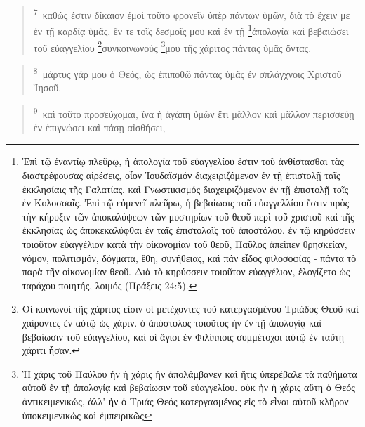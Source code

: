 \documentclass{article}
\newcommand{\currentverse}{1} %
\newcommand{\setcurrentverse}[1]{\renewcommand{\currentverse}{#1}}
\begin{document}
\begin{verse}

\setcurrentverse{7}

\setcounter{footnote}{0}

\textsuperscript{7}~καθώς ἐστιν δίκαιον ἐμοὶ τοῦτο φρονεῖν ὑπὲρ πάντων ὑμῶν, διὰ τὸ ἔχειν με ἐν τῇ καρδίᾳ ὑμᾶς, ἔν τε τοῖς δεσμοῖς μου καὶ ἐν τῇ \footnote{
Ἐπὶ τῷ ἐναντίῳ πλεῦρῳ, ἡ ἀπολογία τοῦ εὐαγγελίου ἔστιν τοῦ ἀνθίστασθαι τὰς διαστρέφουσας αἱρέσεις, οἷον Ἰουδαϊσμόν διαχειριζόμενον ἐν τῇ ἐπιστολῇ ταῖς ἐκκλησίαις τῆς Γαλατίας, καὶ Γνωστικισμός διαχειριζόμενον ἐν τῇ ἐπιστολῇ τοῖς ἐν Κολοσσαῖς. Ἐπὶ τῷ εὐμενεῖ πλεῦρω, ἡ βεβαίωσις τοῦ εὐαγγελλίου ἔστιν πρὸς τὴν κήρυξιν τῶν ἀποκαλύψεων τῶν μυστηρίων τοῦ θεοῦ περὶ τοῦ χριστοῦ καὶ τῆς ἐκκλησίας ὡς ἀποκεκαλύφθαι ἐν ταῖς ἐπιστολαῖς τοῦ ἀποστόλου. ἐν τῷ κηρύσσειν τοιοῦτον εὐαγγέλιον κατὰ τὴν οἰκονομίαν τοῦ θεοῦ, Παῦλος ἀπεῖπεν θρησκείαν, νόμον, πολιτισμόν, δόγματα, ἔθη, συνήθειας, καὶ πάν εἶδος φιλοσοφίας - πάντα τὸ παρὰ τῆν οἰκονομίαν θεοῦ. Διὰ τὸ κηρύσσειν τοιοῦτον εὐαγγέλιον, ἐλογίζετο ὡς ταράχου ποιητής, λοιμός (Πράξεις 24:5).
    }ἀπολογίᾳ καὶ βεβαιώσει τοῦ εὐαγγελίου \footnote{
Οἱ κοινωνοὶ τῆς χάριτος εἰσιν οἱ μετέχοντες τοῦ κατεργασμένου Τριάδος Θεοῦ καὶ χαίροντες ἐν αὐτῷ ὡς χάριν. ὁ ἀπόστολος τοιοῦτος ἠν ἐν τῇ ἀπολογίᾳ καὶ βεβαίωσιν τοῦ εὐαγγελίου, καὶ οἱ ἅγιοι ἐν Φιλίπποις συμμέτοχοι αὐτῷ ἐν ταῦτῃ χάριτι ἦσαν.
    }συνκοινωνούς \footnote{
Ἡ χάρις τοῦ Παύλου ἠν ἡ χάρις ἣν ἀπολάμβανεν καὶ ἥτις ὑπερέβαλε τὰ παθήματα αὐτοῦ ἐν τῇ ἀπολογίᾳ καὶ βεβαίωσιν τοῦ εὐαγγελίου. οὐκ ἠν ἡ χάρις αὕτη ὁ Θεός ἀντικειμενικώς, ἀλλ’ ἠν ὁ Τριάς Θεός κατεργασμένος εἰς τὸ εἶναι αὐτοῦ κλῆρον ὑποκειμενικώς καὶ ἐμπειρικῶς
    }μου τῆς χάριτος πάντας ὑμᾶς ὄντας.

\end{verse}

\begin{verse}

\setcurrentverse{8}

\setcounter{footnote}{0}

\textsuperscript{8}~μάρτυς γάρ μου ὁ Θεός, ὡς ἐπιποθῶ πάντας ὑμᾶς ἐν σπλάγχνοις Χριστοῦ Ἰησοῦ.

\end{verse}

\begin{verse}

\setcurrentverse{9}

\setcounter{footnote}{0}

\textsuperscript{9}~καὶ τοῦτο προσεύχομαι, ἵνα ἡ ἀγάπη ὑμῶν ἔτι μᾶλλον καὶ μᾶλλον περισσεύῃ ἐν ἐπιγνώσει καὶ πάσῃ αἰσθήσει,

\end{verse}
\end{document}
